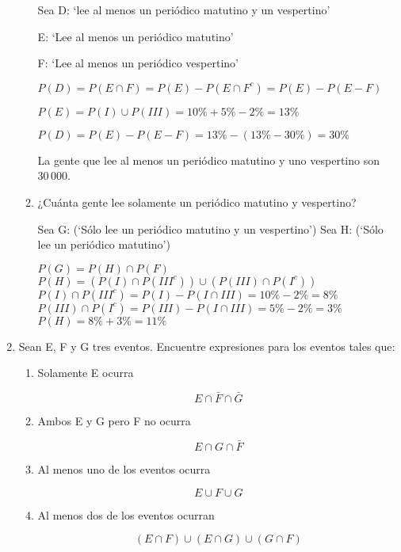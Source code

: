 \documentclass[letterpaper,11pt]{article}
\renewcommand{%
	\contentsname}{\vspace{-1cm} \hfill\bfseries\LARGE Índice \hfill \vspace{0.2cm}%
}
\begin{document}
\begin{enumerate}
\begin{enumerate}
	Sea D: `lee al menos un periódico matutino y un vespertino'

	E: `Lee al menos un periódico matutino'

	F: `Lee al menos un periódico vespertino'


	$P(D)= P(E \cap F) = P(E) - P(E \cap F^c) = P(E) - P (E - F)$


	$P(E)= P(I) \cup P(III) = 10\% + 5\% - 2\% = 13\%$

	$P(D) = P(E) - P (E - F) = 13\% - (13\% - 30\%) = 30\%$

	
	La gente que lee al menos un periódico matutino y uno vespertino son $30\,000$.

	\item ¿Cuánta gente lee solamente un periódico matutino y vespertino?
	
	Sea G: (`Sólo lee un periódico matutino y un vespertino')
	Sea H: (`Sólo lee un periódico matutino')

	$P(G) = P(H) \cap P(F)$
	$P(H)=(P(I) \cap P(III^c)) \cup (P(III) \cap P(I^c))$
	$P(I) \cap P(III^c) = P(I)- P(I \cap III) = 10\% - 2\% = 8\%$
	$P(III) \cap P(I^c)= P(III) - P(I \cap III) = 5\% - 2\% = 3\% $
	$P(H)= 8\% + 3\% = 11\%$
	

\end{enumerate}

\item Sean E, F y G tres eventos. Encuentre expresiones para los eventos tales que:

\begin{enumerate}
	\item Solamente E ocurra
	
	$$
	E \cap \bar{F} \cap \bar{G}
	$$

	\item Ambos E y G pero F no ocurra 
	
	$$ E \cap G \cap \bar{F} $$

	\item Al menos uno de los eventos ocurra 
	
	$$ E \cup F \cup G $$

	\item Al menos dos de los eventos ocurran 
	
	$$ (E \cap F) \cup (E \cap G) \cup (G \cap F) $$


\end{enumerate}
\end{enumerate}
\end{document}
